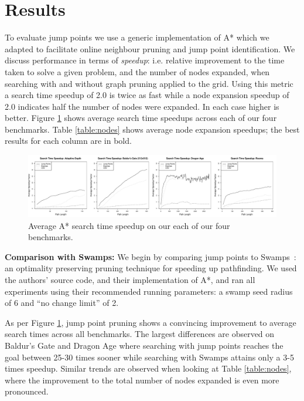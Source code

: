 \section{Results}
To evaluate jump points we use a generic implementation of A* which we 
adapted to facilitate online neighbour pruning and jump point identification.
We discuss
performance in terms of \emph{speedup}: i.e. relative improvement to the time 
taken to solve a given problem, and the number of nodes expanded, when searching
with and without graph pruning applied to the grid.
Using this metric a search time speedup
of 2.0 is twice as fast while a node expansion speedup of 2.0 indicates half the
number of nodes were expanded.  In each case higher is better.
Figure \ref{fig:speedup} shows average search time speedups across
each of our four benchmarks. Table \ref{table:nodes} shows average
node expansion speedups; the best results for each column are in bold.



\begin{figure}[t]
   \begin{center}
	   \includegraphics[width=2.0\columnwidth, trim = 10mm 10mm 10mm 0mm]
		{diagrams/speedup.pdf}
   \end{center}
   \caption{Average A* search time speedup on our each of our four benchmarks. }

\label{fig:speedup}
\end{figure}

\textbf{Comparison with Swamps: }
We begin by comparing jump points to Swamps~\cite{pochter10}: an optimality
preserving pruning technique for speeding up pathfinding.  
We used the authors' source code, and their implementation of A*, and ran
all experiments using their recommended running parameters: a swamp seed radius
of 6 and ``no change limit'' of 2.

As per Figure \ref{fig:speedup}, jump point pruning shows a convincing
improvement to average search times across all benchmarks.
The largest differences are
observed on Baldur's Gate and Dragon Age where searching with jump points
reaches the goal between 25-30 times sooner while searching with Swamps attains only a 3-5
times speedup.  Similar trends are observed when looking at Table
\ref{table:nodes}, where the improvement to the total number of nodes expanded
is even more pronounced.

